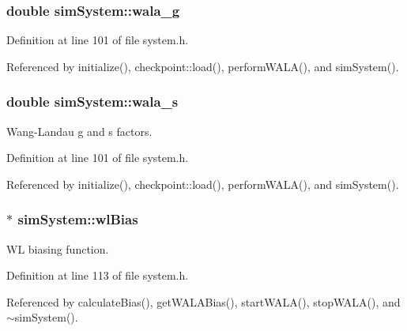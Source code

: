 \hypertarget{classsim_system_aa2e866e69ebe5fa0761894212592175a}{
\subsubsection[{wala\-\_\-g}]{\setlength{\rightskip}{0pt plus 5cm}double sim\-System\-::wala\-\_\-g}}\label{classsim_system_aa2e866e69ebe5fa0761894212592175a}


Definition at line 101 of file system.\-h.



Referenced by initialize(), checkpoint\-::load(), perform\-W\-A\-L\-A(), and sim\-System().

\hypertarget{classsim_system_a7cc3431bb59acca9165b044dbd07dcdc}{
\subsubsection[{wala\-\_\-s}]{\setlength{\rightskip}{0pt plus 5cm}double sim\-System\-::wala\-\_\-s}}\label{classsim_system_a7cc3431bb59acca9165b044dbd07dcdc}


Wang-\/\-Landau g and s factors. 



Definition at line 101 of file system.\-h.



Referenced by initialize(), checkpoint\-::load(), perform\-W\-A\-L\-A(), and sim\-System().

\hypertarget{classsim_system_a6dc8d9f89dfcfa247a59bc50889c49e7}{
\subsubsection[{wl\-Bias}]{$\ast$ sim\-System\-::wl\-Bias}}\label{classsim_system_a6dc8d9f89dfcfa247a59bc50889c49e7}


W\-L biasing function. 



Definition at line 113 of file system.\-h.



Referenced by calculate\-Bias(), get\-W\-A\-L\-A\-Bias(), start\-W\-A\-L\-A(), stop\-W\-A\-L\-A(), and $\sim$sim\-System().

